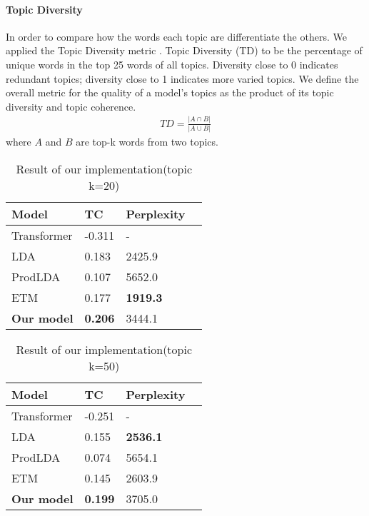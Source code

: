 \paragraph{Topic Diversity} In order to compare how the words each topic are differentiate the others. We applied the Topic Diversity metric \cite{dieng_topic_2019}. Topic Diversity (TD) to be the percentage of unique words in the top 25 words of all topics. Diversity close to 0 indicates redundant topics; diversity close to 1 indicates more varied topics. We define the overall metric for the quality of a model’s topics as the product of its topic diversity and topic coherence.
\begin{align*}
TD=\frac{|A\cap B|}{|A \cup B|}
\end{align*}
where $ A $ and $ B $ are top-k words from two topics. 
\begin{table}[]
\centering
\begin{tabular}{llll}
\hline
Model      & TC     & Perplexity  \\ \hline
Transformer & -0.311 & - \\
LDA & 0.183 & 2425.9 \\
ProdLDA		&  0.107 & 5652.0\\
ETM	     	&  0.177 & \textbf{1919.3}\\
\textbf{Our model}  & \textbf{0.206} & 3444.1 \\ \hline
\end{tabular}
\caption{Result of our implementation(topic k=20)}
\end{table}
\begin{table}[]
\centering
\begin{tabular}{llll}
\hline
Model      & TC     & Perplexity  \\ \hline
Transformer & -0.251 & - \\
LDA & 0.155 & \textbf{2536.1} \\
ProdLDA		&  0.074 & 5654.1\\
ETM	     	&  0.145 & 2603.9\\
\textbf{Our model}  & \textbf{0.199} & 3705.0 \\ \hline
\end{tabular}
\caption{Result of our implementation(topic k=50)}
\end{table}

